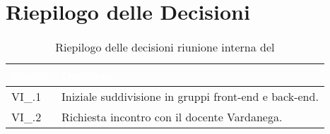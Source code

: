 \section{Riepilogo delle Decisioni}


\begin{table}[!htbp]
\renewcommand{\arraystretch}{1.5}
\begin{tabular}{m{}<{\centering}  m{}<{\centering}}
\rowcolor{darkblue} \textcolor{white}{\textbf{Codice}} & \textcolor{white}{\textbf{Decisione}} \\
\hline
VI\_{}\D{}.1 & Iniziale suddivisione in gruppi front-end e back-end.\\
VI\_{}\D{}.2 & Richiesta incontro con il docente Vardanega.\\
\end{tabular}
\caption{Riepilogo delle decisioni riunione interna del \D}
\end{table}